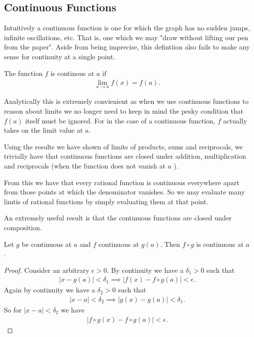 \documentclass[]{article}
\begin{document}
\subsection{Continuous Functions}

Intuitively a continuous function is one for which the graph has no sudden jumps, infinite oscillations, etc. That is, one which we may "draw without lifting our pen from the paper". Aside from being imprecise, this defintiion also fails to make any sense for continuity at a single point. 

\begin{defi} 
	The function $f$ is continous at $a$ if 
	\begin{align*}
			\lim_{x \to a} f(x) = f(a).
	\end{align*}
\end{defi}

Analytically this is extremely convienient as when we use continuous functions to reason about limits we no longer need to keep in mind the pesky condition that $f(a)$ itself must be ignored. For in the case of a continuous function, $f$ actually takes on the limit value at $a$.

Using the results we have shown of limits of products, sums and reciprocals, we trivially have that continuous functions are closed under addition, multiplication and reciprocals (when the function does not vanish at $a$ ). 

From this we have that every rational function is continuous everywhere apart from those points at which the denominator vanishes. So we may evaluate many limtis of rational functions by simply evaluating them at that point.

An extremely useful result is that the continuous functions are closed under composition. 

\begin{thm} 
		Let $g$ be continuous at $a$ and $f$ continuous at $g(a)$. Then $f \circ g$ is continuous at $a$.
\end{thm}

\begin{proof}
	Consider an arbitrary $\epsilon > 0$. By continuity we have a $\delta_1 > 0$ such that 
	\begin{align*}
			|x - g(a)| < \delta_1 \implies |f(x) - f\circ g(a)| < \epsilon.
	\end{align*}
	Again by continuity we have a $\delta_2 > 0$ such that 
	\begin{align*}
			|x-a| < \delta_2 \implies |g(x) - g(a)| < \delta_1.
	\end{align*}
	So for $|x - a| < \delta_2$ we have
	\begin{align*}
			|f \circ g(x) - f \circ g(a)| < \epsilon.
	\end{align*}
\end{proof}
\end{document}
